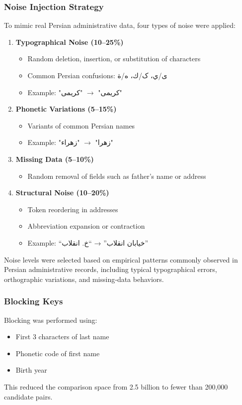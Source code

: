 \documentclass[twoside]{article}
\begin{document}
\subsubsection{Noise Injection Strategy}
To mimic real Persian administrative data, four types of noise were applied:
\begin{enumerate}[label=\textbf{\alph*.}]
	\item \textbf{Typographical Noise (10--25\%)}
	\begin{itemize}
		\item Random deletion, insertion, or substitution of characters
		\item Common Persian confusions: {\persianfont ی/ي، ک/ك، ه/ة}
		\item Example: {\persianfont "کریمی"} $\rightarrow$ {\persianfont "كريمی"}
	\end{itemize}
	
	\item \textbf{Phonetic Variations (5--15\%)}
	\begin{itemize}
		\item Variants of common Persian names
		\item Example: {\persianfont "زهرا"} $\rightarrow$ {\persianfont "زهراء"}
	\end{itemize}
	
	\item \textbf{Missing Data (5--10\%)}
	\begin{itemize}
		\item Random removal of fields such as father's name or address
	\end{itemize}
	
	\item \textbf{Structural Noise (10--20\%)}
	\begin{itemize}
		\item   Token reordering in addresses
		\item	Abbreviation expansion or contraction
		\item	Example: “خیابان انقلاب” → “خ. انقلاب”
		
	\end{itemize}
\end{enumerate}
Noise levels were selected based on empirical patterns commonly observed in Persian administrative records, including typical typographical errors, orthographic variations, and missing‑data behaviors. 
\subsubsection{Blocking Keys}
Blocking was performed using:
\begin{itemize}
	\item	First 3 characters of last name
	\item	Phonetic code of first name
	\item	Birth year
\end{itemize}
This reduced the comparison space from 2.5 billion to fewer than 200,000 candidate pairs.
\end{document}

